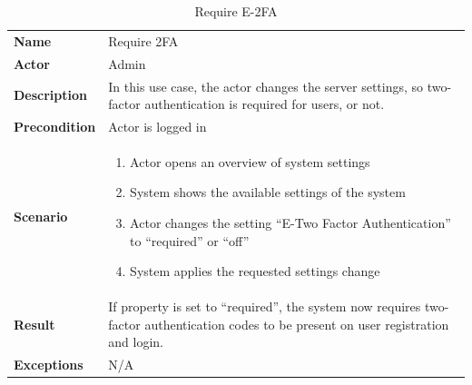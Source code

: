 \begin{table}[ht]
    \caption{Require E-2FA }
    \begin{tabular}{|L{5cm}|L{10cm}|}
        \toprule
        \textbf{Name}         & Require 2FA      \\
        \textbf{Actor}        & Admin              \\
        \textbf{Description} & In this use case, the actor changes the server settings, so two-factor authentication is
        required for users, or not.   \\
        \textbf{Precondition} & Actor is logged in \\
        \textbf{Scenario} &
        \vspace{-0.75cm}
        \begin{enumerate}
            \setlength\itemsep{-0.5em}
            \item Actor opens an overview of system settings
            \item System shows the available settings of the system
            \item Actor changes the setting \enquote{E-Two Factor Authentication} to \enquote{required} or \enquote{off}
            \item  System applies the requested settings change
        \end{enumerate} \\[-0.5cm]
        \textbf{Result} & If property is set to \enquote{required}, the system now requires two-factor authentication
        codes to be present on user registration and login. \\
        \textbf{Exceptions}   & N/A                \\
        \bottomrule
    \end{tabular}
    \label{tab:table36}
\end{table}

